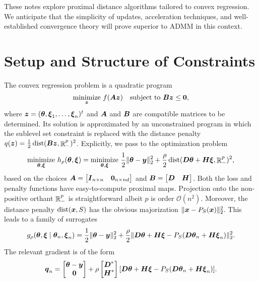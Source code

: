 \documentclass{article}
\begin{document}
These notes explore proximal distance algorithms tailored to convex regression.
We anticipate that the simplicity of updates, acceleration techniques, and well-established convergence theory will prove superior to ADMM in this context.

\section*{\center Setup and Structure of Constraints}

The convex regression problem is a quadratic program
\begin{equation*}
    \underset{\boldsymbol{z}}{\mathrm{minimize}}
    ~f(\boldsymbol{A} \boldsymbol{z}) \quad
    \text{subject to}
    ~\boldsymbol{B} \boldsymbol{z} \le \boldsymbol{0},
\end{equation*}
where \(\boldsymbol{z} = (\boldsymbol{\theta}, \boldsymbol{\xi}_{1}, \ldots, \boldsymbol{\xi}_{n})^{t}\) and \(\boldsymbol{A}\) and \(\boldsymbol{B}\) are compatible matrices to be determined.
Its solution is approximated by an unconstrained program in which the sublevel set constraint is replaced with the distance penalty \(q(\boldsymbol{z}) = \frac{1}{2} \mathop{\rm dist}\nolimits(\boldsymbol{B} \boldsymbol{z}, \mathop{\mathbb{R}}\nolimits_{-}^{p})^{2}\).
Explicitly, we pass to the optimization problem
\begin{equation}
    \label{eq:unconstrained_problem}
    \underset{\boldsymbol{\theta}, \boldsymbol{\xi}}{\mathrm{minimize}}
    ~h_{\rho}(\boldsymbol{\theta}, \boldsymbol{\xi})
    =
    \underset{\boldsymbol{\theta}, \boldsymbol{\xi}}{\mathrm{minimize}}
    ~\frac{1}{2} \|\boldsymbol{\theta} - \boldsymbol{y}\|^{2}_{2}
    + \frac{\rho}{2} \mathop{\rm dist}\nolimits(\boldsymbol{D} \boldsymbol{\theta} + \boldsymbol{H} \boldsymbol{\xi}, \mathop{\mathbb{R}}\nolimits_{-}^{p})^{2},
\end{equation}
based on the choices \(\boldsymbol{A} = \begin{bmatrix}
    \boldsymbol{I}_{n \times n} & \boldsymbol{0}_{n \times nd}
\end{bmatrix}\)
and \(\boldsymbol{B} = \begin{bmatrix}
    \boldsymbol{D} & \boldsymbol{H}
\end{bmatrix}\).
Both the loss and penalty functions have easy-to-compute proximal maps.
Projection onto the non-positive orthant \(\mathop{\mathbb{R}}\nolimits_{-}^{p}\) is straightforward albeit \(p\) is order \(\mathcal{O}(n^{2})\).
Moreover, the distance penalty \(\mathop{\rm dist}\nolimits(\boldsymbol{x}, S)\) has the obvious majorization \(\|\boldsymbol{x} - P_{S}(\boldsymbol{x})\|^{2}_{2}\).
This leads to a family of surrogates
\begin{equation}
    \label{eq:distance_majorization}
    g_{\rho}(\boldsymbol{\theta}, \boldsymbol{\xi} \mid \boldsymbol{\theta}_{n}, \boldsymbol{\xi}_{n})
    =
    \frac{1}{2} \|\boldsymbol{\theta} - \boldsymbol{y}\|^{2}_{2}
    +
    \frac{\rho}{2} \|\boldsymbol{D} \boldsymbol{\theta} + \boldsymbol{H} \boldsymbol{\xi} - P_{S}(\boldsymbol{D} \boldsymbol{\theta}_{n} + \boldsymbol{H} \boldsymbol{\xi}_{n})\|^{2}_{2}.
\end{equation}
The relevant gradient is of the form
\begin{equation*}
    \boldsymbol{q}_{n}
    =
    \begin{bmatrix}
        \boldsymbol{\theta} - \boldsymbol{y} \\
        \boldsymbol{0}
    \end{bmatrix}
    +
    \rho \begin{bmatrix}
        \boldsymbol{D}^{\ast} \\
        \boldsymbol{H}^{\ast}
    \end{bmatrix}[\boldsymbol{D} \boldsymbol{\theta} + \boldsymbol{H} \boldsymbol{\xi}
        - P_{S}(\boldsymbol{D} \boldsymbol{\theta}_{n} + \boldsymbol{H} \boldsymbol{\xi}_{n})].
\end{equation*}
\end{document}
